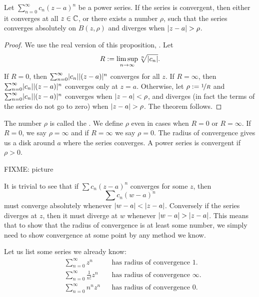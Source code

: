 \begin{prop}
Let $\sum_{n=0}^\infty c_n {(z-a)}^n$ be a power series.
If the series is convergent, then either it converges at
all $z \in {\mathbb{C}}$, or
there exists a number $\rho$, such that
the series converges absolutely on $B(z,\rho)$
and diverges when $\lvert {z-a} \rvert > \rho$.
\end{prop}

\begin{proof}
We use the real version of this proposition,
.
Let
\begin{equation*}
R := \limsup_{n\to\infty} \sqrt[n]{\lvert {c_n} \rvert} .
\end{equation*}
If $R = 0$, then
$\sum_{n=0}^\infty \lvert {c_n} \rvert \lvert {(z-a)} \rvert^n$ converges for all $z$.
If $R = \infty$, then
$\sum_{n=0}^\infty \lvert {c_n} \rvert \lvert {(z-a)} \rvert^n$ converges only at $z=a$.
Otherwise, let $\rho := \nicefrac{1}{R}$ and
$\sum_{n=0}^\infty \lvert {c_n} \rvert \lvert {(z-a)} \rvert^n$ converges when
$\lvert {z-a} \rvert < \rho$, and diverges (in fact the terms of the series
do not go to zero) when $\lvert {z-a} \rvert > \rho$.
The theorem follows.
\end{proof}

The number $\rho$ is called the \emph{}.
We define $\rho$ even in cases when $R=0$ or $R= \infty$.  If $R=0$, we say
$\rho = \infty$ and if $R=\infty$ we say $\rho=0$.
The radius of convergence gives us a disk around $a$ where the series converges.  A power series
is convergent if $\rho > 0$.

FIXME: picture

It is trivial to see that if $\sum c_n {(z-a)}^n$ converges
for some $z$, then
\begin{equation*}
\sum c_n {(w-a)}^n
\end{equation*}
must converge absolutely whenever $\lvert {w-a} \rvert < \lvert {z-a} \rvert$.
Conversely if the series diverges at $z$, then it must diverge at $w$
whenever $\lvert {w-a} \rvert > \lvert {z-a} \rvert$.
This means that to show
that the radius of convergence is at least some number, we simply need to
show convergence at some point by any method we know.

\begin{example}
Let us list some series we already know:
\begin{align*}
& &
& \sum_{n=0}^\infty z^n
& & \text{has radius of convergence $1$.}
& &
\\
& &
& \sum_{n=0}^\infty \frac{1}{n!} z^n
& & \text{has radius of convergence $\infty$.}
& &
\\
& &
& \sum_{n=0}^\infty n^n z^n
& & \text{has radius of convergence $0$.}
& &
\end{align*}
\end{example}

